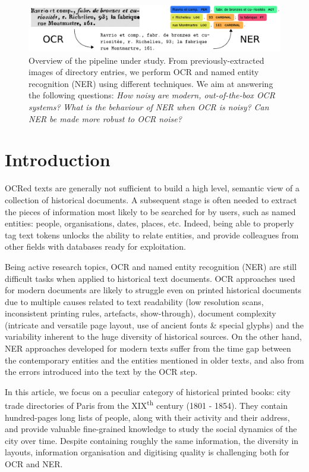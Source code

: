 \begin{figure}[!h]
    \centering
    \includegraphics[width=.9\textwidth]{figs/overview-intro.pdf}
    \caption{%
    Overview of the pipeline under study.
    From previously-extracted images of directory entries, 
    we perform OCR and named entity recognition (NER) using different techniques.
    We aim at answering the following questions:
    \emph{How noisy are modern, out-of-the-box OCR systems?}
    \emph{What is the behaviour of NER when OCR is noisy?}
    \emph{Can NER be made more robust to OCR noise?}
    }
    \label{<label>}
\end{figure}
\clearpage%

\section{Introduction}

OCRed texts are generally not sufficient to build a high level, semantic view of a collection of historical documents.
A subsequent stage is often needed to extract the pieces of information most likely to be searched for by users, such as named entities: people, organisations, dates, places, etc.
Indeed, being able to properly tag text tokens unlocks the ability to relate entities, and provide colleagues from other fields with databases ready for exploitation.

Being active research topics, OCR and named entity recognition (NER) are still difficult tasks when applied to historical text documents.
OCR approaches used for modern documents are likely to struggle even on printed historical documents due to multiple causes related to text readability (low resolution scans, inconsistent printing rules, artefacts, show-through), document complexity (intricate and versatile page layout, use of ancient fonts \& special glyphs) and the variability inherent to the huge diversity of historical sources.
On the other hand, NER approaches developed for modern texts suffer from the time gap between the contemporary entities and the entities mentioned in older texts, and also from the errors introduced into the text by the OCR step.

In this article, we focus on a peculiar category of historical printed books: city trade directories of Paris from the XIX\textsuperscript{th} century (1801 - 1854).
They contain hundred-pages long lists of people, along with their activity and their address, and provide valuable fine-grained knowledge to study the social dynamics of the city over time.
Despite containing roughly the same information, the diversity in layouts, information organisation and digitising quality is challenging both for OCR and NER.

